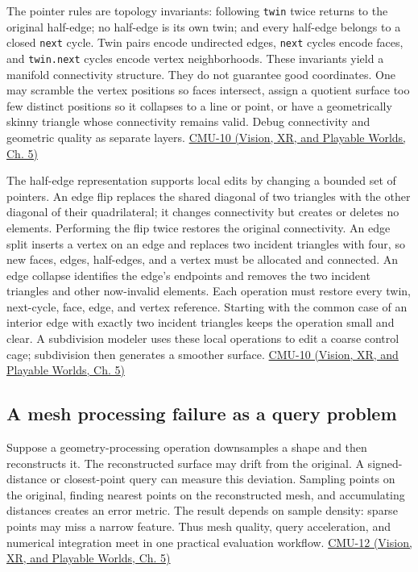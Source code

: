 The pointer rules are topology invariants: following \texttt{twin} twice returns to the original half-edge; no half-edge is its own twin; and every half-edge belongs to a closed \texttt{next} cycle. Twin pairs encode undirected edges, \texttt{next} cycles encode faces, and \texttt{twin.next} cycles encode vertex neighborhoods. These invariants yield a manifold connectivity structure. They do not guarantee good coordinates. One may scramble the vertex positions so faces intersect, assign a quotient surface too few distinct positions so it collapses to a line or point, or have a geometrically skinny triangle whose connectivity remains valid. Debug connectivity and geometric quality as separate layers. \href{../07-Vision-XR-and-Playable-Worlds/main.pdf\#nameddest=04-visual-computing-ii-ch036-cmu-10---meshes-and-manifolds}{CMU-10 (Vision, XR, and Playable Worlds, Ch. 5)}

The half-edge representation supports local edits by changing a bounded set of pointers. An edge flip replaces the shared diagonal of two triangles with the other diagonal of their quadrilateral; it changes connectivity but creates or deletes no elements. Performing the flip twice restores the original connectivity. An edge split inserts a vertex on an edge and replaces two incident triangles with four, so new faces, edges, half-edges, and a vertex must be allocated and connected. An edge collapse identifies the edge's endpoints and removes the two incident triangles and other now-invalid elements. Each operation must restore every twin, next-cycle, face, edge, and vertex reference. Starting with the common case of an interior edge with exactly two incident triangles keeps the operation small and clear. A subdivision modeler uses these local operations to edit a coarse control cage; subdivision then generates a smoother surface. \href{../07-Vision-XR-and-Playable-Worlds/main.pdf\#nameddest=04-visual-computing-ii-ch036-cmu-10---meshes-and-manifolds}{CMU-10 (Vision, XR, and Playable Worlds, Ch. 5)}

\subsection{A mesh processing failure as a query problem}\label{03-visual-computing-i-ch002-a-mesh-processing-failure-as-a-query-problem}

Suppose a geometry-processing operation downsamples a shape and then reconstructs it. The reconstructed surface may drift from the original. A signed-distance or closest-point query can measure this deviation. Sampling points on the original, finding nearest points on the reconstructed mesh, and accumulating distances creates an error metric. The result depends on sample density: sparse points may miss a narrow feature. Thus mesh quality, query acceleration, and numerical integration meet in one practical evaluation workflow. \href{../07-Vision-XR-and-Playable-Worlds/main.pdf\#nameddest=04-visual-computing-ii-ch036-cmu-12---geometric-queries}{CMU-12 (Vision, XR, and Playable Worlds, Ch. 5)}

